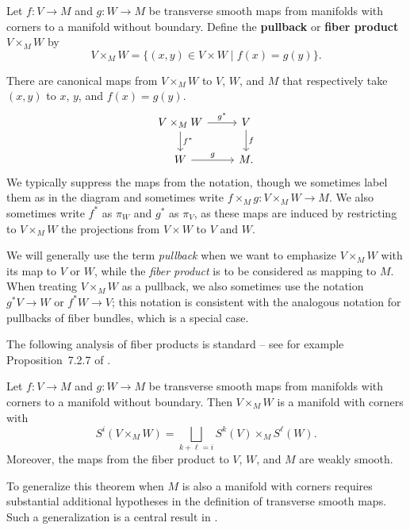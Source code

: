 \begin{definition}\label{D: top pullback}
	Let $f \colon V \to M$ and $g \colon W \to M$ be transverse smooth maps from manifolds with corners to a manifold without boundary.
	Define the \textbf{pullback} or \textbf{fiber product} $V \times_M W$ by
	$$V \times _M W = \{(x, y) \in V \times W \mid f(x) = g(y)\}.$$

	There are canonical maps from $V \times _M W$ to $V$, $W$, and $M$ that respectively take $(x,y)$ to $x$, $y$, and $f(x) = g(y)$.
	\[
	\begin{tikzcd}
		V \times_M W \arrow[r, "g^*"] \arrow[d, "f^*"] & V \arrow[d, "f"] \\
		W \arrow[r, "g"] & M.
	\end{tikzcd}
	\]
	We typically suppress the maps from the notation, though we sometimes label them as in the diagram and sometimes write $f \times _M g \colon V \times _M W \to M$.
	We also sometimes write $f^*$ as $\pi_W$ and $g^*$ as $\pi_V$, as these maps are induced by restricting to $V \times _MW$ the projections from $V \times W$ to $V$ and $W$.

	We will generally use the term \textit{pullback} when we want to emphasize $V \times _M W$ with its map to $V$ or $W$, while the \textit{fiber product} is to be considered as mapping to $M$.
	When treating $V \times _M W$ as a pullback, we also sometimes use the notation $g^*V \to W$ or $f^*W \to V$; this notation is consistent with the analogous notation for pullbacks of fiber bundles, which is a special case.
\end{definition}

The following analysis of fiber products is standard -- see for example Proposition~7.2.7 of \cite{MaDo92}.

\begin{theorem}\label{pullback}
	Let $f \colon V \to M$ and $g \colon W \to M$ be transverse smooth maps from manifolds with corners to a manifold without boundary.
	Then $V \times _M W$ is a manifold with corners with
	\begin{equation*}
		S^i(V \times _M W) = \bigsqcup_{k + \ell = i} S^k(V) \times _M S^\ell(W).
	\end{equation*}
	Moreover, the maps from the fiber product to $V$, $W$, and $M$ are weakly smooth.
\end{theorem}

To generalize this theorem when $M$ is also a manifold with corners requires substantial additional hypotheses in the definition of transverse smooth maps.
Such a generalization is a central result in \cite{Joy12}.

